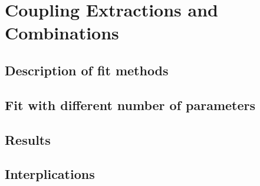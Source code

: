 \section{Coupling Extractions and Combinations}
\label{sec:combinations}

\subsection{Description of fit methods}
\subsection{Fit with different number of parameters}
\subsection{Results}
\subsection{Interplications}
